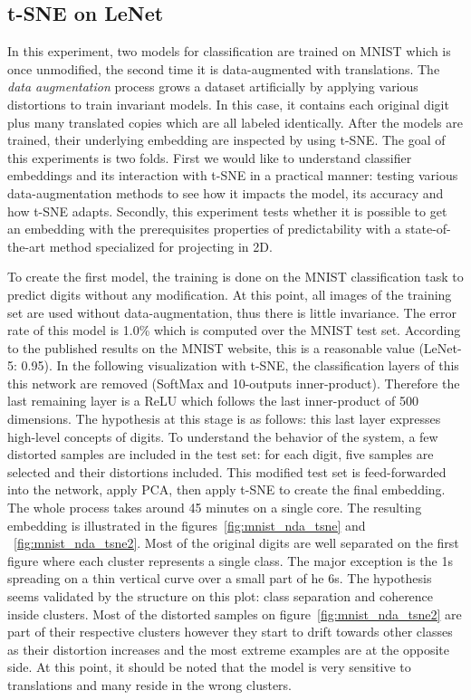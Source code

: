 \documentclass[a4paper,12pt]{report}
\begin{document}

\subsection{t-SNE on LeNet}

In this experiment, two models for classification are trained on MNIST which is once unmodified, the second time it is data-augmented with translations.
The {\em data augmentation} process grows a dataset artificially by applying various distortions to train invariant models.
In this case, it contains each original digit plus many translated copies which are all labeled identically.
After the models are trained, their underlying embedding are inspected by using t-SNE.
The goal of this experiments is two folds.
First we would like to understand classifier embeddings and its interaction with t-SNE in a practical manner: testing various data-augmentation methods to see how it impacts the model, its accuracy and how t-SNE adapts.
Secondly, this experiment tests whether it is possible to get an embedding with the prerequisites properties of predictability with a state-of-the-art method specialized for projecting in 2D.

To create the first model, the training is done on the MNIST classification task to predict digits without any modification.
At this point, all images of the training set are used without data-augmentation, thus there is little invariance.
The error rate of this model is 1.0\% which is computed over the MNIST test set.
According to the published results on the MNIST website, this is a reasonable value (LeNet-5: 0.95)\cite{mnist_web}.
In the following visualization with t-SNE, the classification layers of this this network are removed (SoftMax and 10-outputs inner-product).
Therefore the last remaining layer is a ReLU which follows the last inner-product of 500 dimensions.
The hypothesis at this stage is as follows: this last layer expresses high-level concepts of digits.
To understand the behavior of the system, a few distorted samples are included in the test set: for each digit, five samples are selected and their distortions included.
This modified test set is feed-forwarded into the network, apply PCA, then apply t-SNE to create the final embedding.
The whole process takes around 45 minutes on a single core.
The resulting embedding is illustrated in the figures~\ref{fig:mnist_nda_tsne} and ~\ref{fig:mnist_nda_tsne2}.
Most of the original digits are well separated on the first figure where each cluster represents a single class.
The major exception is the 1s spreading on a thin vertical curve over a small part of he 6s.
The hypothesis seems validated by the structure on this plot: class separation and coherence inside clusters.
Most of the distorted samples on figure~\ref{fig:mnist_nda_tsne2} are part of their respective clusters however they start to drift towards other classes as their distortion increases and the most extreme examples are at the opposite side.
At this point, it should be noted that the model is very sensitive to translations and many reside in the wrong clusters.
\end{document}
